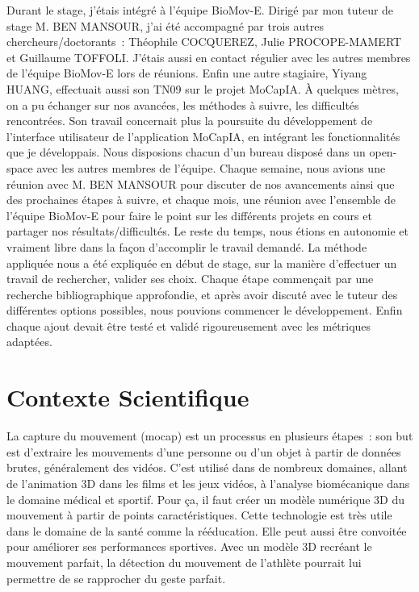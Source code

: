     Durant le stage, j'étais intégré à l'équipe BioMov-E. Dirigé par mon tuteur de stage M. BEN MANSOUR, j'ai été accompagné par trois autres chercheurs/doctorants : Théophile COCQUEREZ, Julie PROCOPE-MAMERT et Guillaume TOFFOLI. J'étais aussi en contact régulier avec les autres membres de l'équipe BioMov-E lors de réunions. Enfin une autre stagiaire, Yiyang HUANG, effectuait aussi son TN09 sur le projet MoCapIA. À quelques mètres, on a pu échanger sur nos avancées, les méthodes à suivre, les difficultés rencontrées. Son travail concernait plus la poursuite du développement de l'interface utilisateur de l'application MoCapIA, en intégrant les fonctionnalités que je développais. Nous disposions chacun d'un bureau disposé dans un open-space avec les autres membres de l'équipe. Chaque semaine, nous avions une réunion avec M. BEN MANSOUR pour discuter de nos avancements ainsi que des prochaines étapes à suivre, et chaque mois, une réunion avec l'ensemble de l'équipe BioMov-E pour faire le point sur les différents projets en cours et partager nos résultats/difficultés. Le reste du temps, nous étions en autonomie et vraiment libre dans la façon d'accomplir le travail demandé. La méthode appliquée nous a été expliquée en début de stage, sur la manière d'effectuer un travail de rechercher, valider ses choix. Chaque étape commençait par une recherche bibliographique approfondie, et après avoir discuté avec le tuteur des différentes options possibles, nous pouvions commencer le développement. Enfin chaque ajout devait être testé et validé rigoureusement avec les métriques adaptées.

\section{Contexte Scientifique}

    La capture du mouvement (mocap) est un processus en plusieurs étapes : son but est d'extraire les mouvements d'une personne ou d'un objet à partir de données brutes, généralement des vidéos. C'est utilisé dans de nombreux domaines, allant de l'animation 3D dans les films et les jeux vidéos, à l'analyse biomécanique dans le domaine médical et sportif. Pour ça, il faut créer un modèle numérique 3D du mouvement à partir de points caractéristiques. Cette technologie est très utile dans le domaine de la santé comme la rééducation. Elle peut aussi être convoitée pour améliorer ses performances sportives. Avec un modèle 3D recréant le mouvement parfait, la détection du mouvement de l'athlète pourrait lui permettre de se rapprocher du geste parfait. 
    
